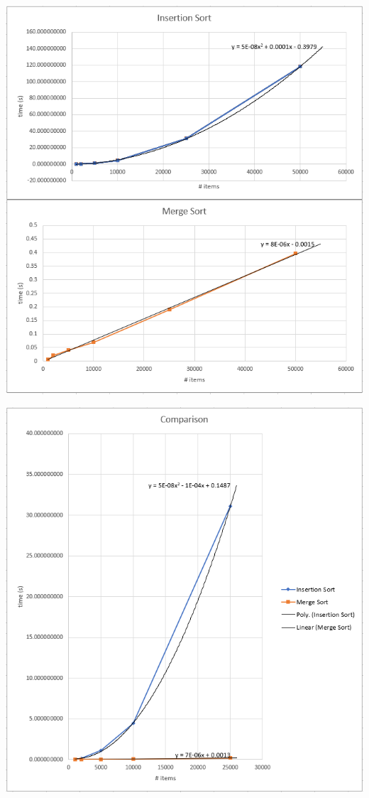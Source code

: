 \documentclass[10pt,a4paper]{report}
\begin{document}
\begin{enumerate}
		\includegraphics[scale=0.6]{sbs.png}
		
		\includegraphics[scale=0.6]{overlay.png}
		

\end{enumerate}
\end{document}
